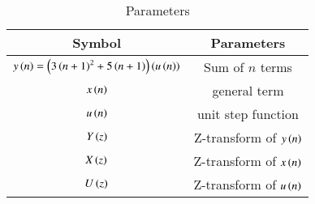 \setlength{\arrayrulewidth}{0.3mm}
\setlength{\tabcolsep}{15pt}
\renewcommand{\arraystretch}{1.4}

\begin{table}[h]
\centering

\begin{tabular}{|c|c|}
\hline

\textbf{Symbol} & \textbf{Parameters}\\
\hline
$y\left(n\right) =\left(3\left(n+1\right)^2 + 5\left(n+1\right)\right)\left(u\left(n\right)\right)$ & Sum of $n$ terms  \\
\hline
$x\left(n\right)$ & general term\\
\hline
$u\left(n\right)$ & unit step function\\
\hline
$Y\left(z\right)$ & Z-transform of $y\left(n\right)$\\
\hline
$X\left(z\right)$ & Z-transform of $x\left(n\right)$\\
\hline
$U\left(z\right)$ & Z-transform of $u\left(n\right)$\\
\hline

\end{tabular}
\vspace{0.25cm}
\caption{Parameters}
\label{tab:11.9.2.13.2}



\end{table}
